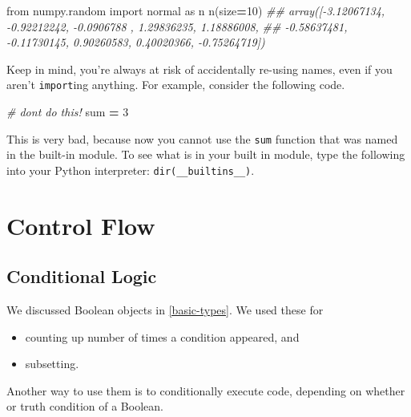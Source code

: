 \documentclass[
  12pt,
]{krantz}
\makeatletter
\newenvironment{Shaded}{\begin{snugshade}}{\end{snugshade}}
\newcommand{\BuiltInTok}[1]{#1}
\newcommand{\CommentTok}[1]{\textcolor[rgb]{0.37,0.37,0.37}{\textit{#1}}}
\newcommand{\DecValTok}[1]{\textcolor[rgb]{0.06,0.06,0.06}{#1}}
\newcommand{\ImportTok}[1]{#1}
\newcommand{\NormalTok}[1]{#1}
\newcommand{\OperatorTok}[1]{\textcolor[rgb]{0.43,0.43,0.43}{\textbf{#1}}}
\providecommand{\tightlist}{%
  \setlength{\itemsep}{0pt}\setlength{\parskip}{0pt}}
\newenvironment{kframe}{%
\medskip{}
\setlength{\fboxsep}{.8em}
 \def\at@end@of@kframe{}%
 \ifinner\ifhmode%
  \def\at@end@of@kframe{\end{minipage}}%
  \begin{minipage}{\columnwidth}%
 \fi\fi%
 \def\FrameCommand##1{\hskip\@totalleftmargin \hskip-\fboxsep
 \colorbox{shadecolor}{##1}\hskip-\fboxsep
     \hskip-\linewidth \hskip-\@totalleftmargin \hskip\columnwidth}%
 \MakeFramed {\advance\hsize-\width
   \@totalleftmargin\z@ \linewidth\hsize
   \@setminipage}}%
 {\par\unskip\endMakeFramed%
 \at@end@of@kframe}
\renewenvironment{Shaded}{\begin{kframe}}{\end{kframe}}
\makeatother
\begin{document}
\begin{Shaded}
\begin{Highlighting}[]
\ImportTok{from}\NormalTok{ numpy.random }\ImportTok{import}\NormalTok{ normal }\ImportTok{as}\NormalTok{ n}
\NormalTok{n(size}\OperatorTok{=}\DecValTok{10}\NormalTok{)}
\CommentTok{\#\# array([{-}3.12067134, {-}0.92212242, {-}0.0906788 ,  1.29836235,  1.18886008,}
\CommentTok{\#\#        {-}0.58637481, {-}0.11730145,  0.90260583,  0.40020366, {-}0.75264719])}
\end{Highlighting}
\end{Shaded}

Keep in mind, you're always at risk of accidentally re-using names, even if you aren't \texttt{import}ing anything. For example, consider the following code.

\begin{Shaded}
\begin{Highlighting}[]
\CommentTok{\# don\textquotesingle{}t do this!}
\BuiltInTok{sum} \OperatorTok{=} \DecValTok{3}
\end{Highlighting}
\end{Shaded}

This is very bad, because now you cannot use the \texttt{sum} function that was named in the built-in module. To see what is in your built in module, type the following into your Python interpreter: \texttt{dir(\_\_builtins\_\_)}.

\hypertarget{control-flow}{%
\chapter{Control Flow}\label{control-flow}}

\hypertarget{conditional-logic}{%
\section{Conditional Logic}\label{conditional-logic}}

We discussed Boolean objects in \ref{basic-types}. We used these for

\begin{itemize}
\tightlist
\item
  counting up number of times a condition appeared, and
\item
  subsetting.
\end{itemize}

Another way to use them is to conditionally execute code, depending on whether or truth condition of a Boolean.
\end{document}
